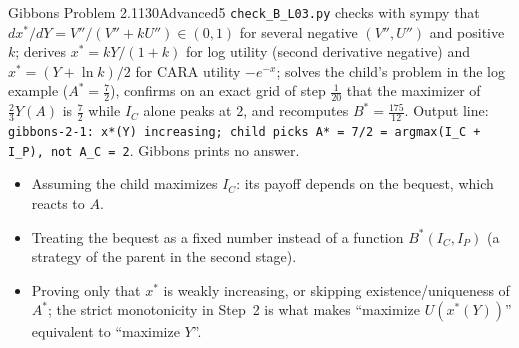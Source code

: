 \begin{exsol}{Gibbons Problem 2.1}{130}{Advanced}{5}
\verify \texttt{check\_B\_L03.py} checks with sympy that $dx^*/dY = V''/(V''+kU'') \in (0,1)$ for
several negative $(V'', U'')$ and positive $k$; derives $x^* = kY/(1+k)$ for log utility (second
derivative negative) and $x^* = (Y + \ln k)/2$ for CARA utility $-e^{-x}$; solves the child's problem
in the log example ($A^* = \frac72$), confirms on an exact grid of step $\frac1{20}$ that the
maximizer of $\frac23 Y(A)$ is $\frac72$ while $I_C$ alone peaks at $2$, and recomputes
$B^* = \frac{175}{12}$. Output line: \texttt{gibbons-2-1: x*(Y) increasing; child picks A* = 7/2 =
argmax(I\_C + I\_P), not A\_C = 2}. Gibbons prints no answer.

\mistakes
\begin{itemize}
  \item Assuming the child maximizes $I_C$: its payoff depends on the bequest, which reacts to $A$.
  \item Treating the bequest as a fixed number instead of a function $B^*(I_C, I_P)$ (a strategy of
  the parent in the second stage).
  \item Proving only that $x^*$ is weakly increasing, or skipping existence/uniqueness of $A^*$;
  the strict monotonicity in Step~2 is what makes ``maximize $U(x^*(Y))$'' equivalent to
  ``maximize $Y$''.
\end{itemize}

\end{exsol}

